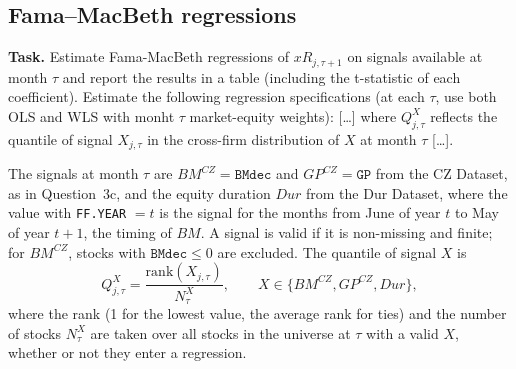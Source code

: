 \documentclass[11pt]{article}
\makeatletter
\newcommand{\xR}{\mathit{xR}}
\newcommand{\BM}{\mathit{BM}}
\newcommand{\GP}{\mathit{GP}}
\newcommand{\Dur}{\mathit{Dur}}
\newcommand{\task}[1]{\par\if@nobreak\else\needspace{5\baselineskip}\fi\medskip\noindent
  \begin{minipage}{\linewidth}\textbf{Task.} #1\end{minipage}\par   %
  \nopagebreak\medskip\@afterheading}   %
\makeatother
\begin{document}
\subsection{Fama--MacBeth regressions}

\task{Estimate Fama-MacBeth regressions of $\xR_{j,\tau+1}$ on signals available at month
$\tau$ and report the results in a table (including the t-statistic of each coefficient).
Estimate the following regression specifications (at each $\tau$, use both OLS and WLS with
monht $\tau$ market-equity weights): [\dots] where $Q^{X}_{j,\tau}$ reflects the quantile of
signal $X_{j,\tau}$ in the cross-firm distribution of $X$ at month $\tau$ [\dots].}

The signals at month $\tau$ are $\BM^{CZ} = \texttt{BMdec}$ and $\GP^{CZ} = \texttt{GP}$ from
the CZ Dataset, as in Question~3c, and the equity duration $\Dur$ from the Dur Dataset, where
the value with \texttt{FF.YEAR} $= t$ is the signal for the months from June of year $t$ to
May of year $t+1$, the timing of $\BM$. A signal is valid if it is non-missing and finite;
for $\BM^{CZ}$, stocks with $\texttt{BMdec} \le 0$ are excluded. The quantile of signal $X$ is
\begin{equation}
  Q^{X}_{j,\tau} = \frac{\mathrm{rank}\left(X_{j,\tau}\right)}{N^{X}_{\tau}},
  \qquad X \in \{\BM^{CZ}, \GP^{CZ}, \Dur\},
  \label{eq:q3d_quantile}
\end{equation}
where the rank (1 for the lowest value, the average rank for ties) and the number of stocks
$N^{X}_{\tau}$ are taken over all stocks in the universe at $\tau$ with a valid $X$, whether
or not they enter a regression.
\end{document}
